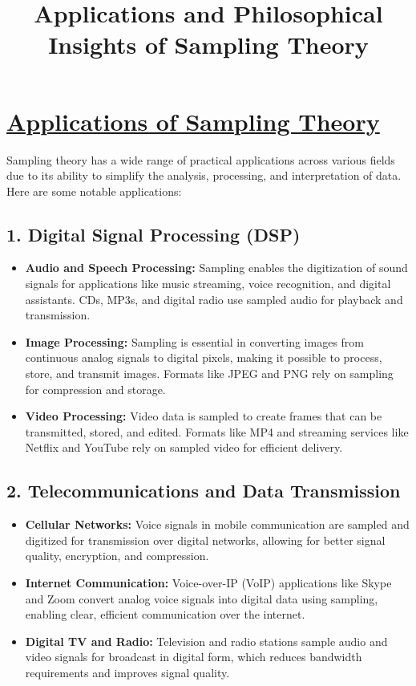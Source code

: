 \documentclass[12pt,a4paper]{report}
\begin{document}
\newpage

\title{\textbf{\Huge Applications and Philosophical Insights of Sampling Theory}}
\date{}



\maketitle

\section*{\underline{\textbf{Applications of Sampling Theory}}}

Sampling theory has a wide range of practical applications across various fields due to its ability to simplify the analysis, processing, and interpretation of data. Here are some notable applications:

\subsection*{1. Digital Signal Processing (DSP)}
\begin{itemize}
    \item \textbf{Audio and Speech Processing:} Sampling enables the digitization of sound signals for applications like music streaming, voice recognition, and digital assistants. CDs, MP3s, and digital radio use sampled audio for playback and transmission.
    \item \textbf{Image Processing:} Sampling is essential in converting images from continuous analog signals to digital pixels, making it possible to process, store, and transmit images. Formats like JPEG and PNG rely on sampling for compression and storage.
    \item \textbf{Video Processing:} Video data is sampled to create frames that can be transmitted, stored, and edited. Formats like MP4 and streaming services like Netflix and YouTube rely on sampled video for efficient delivery.
\end{itemize}

\subsection*{2. Telecommunications and Data Transmission}
\begin{itemize}
    \item \textbf{Cellular Networks:} Voice signals in mobile communication are sampled and digitized for transmission over digital networks, allowing for better signal quality, encryption, and compression.
    \item \textbf{Internet Communication:} Voice-over-IP (VoIP) applications like Skype and Zoom convert analog voice signals into digital data using sampling, enabling clear, efficient communication over the internet.
    \item \textbf{Digital TV and Radio:} Television and radio stations sample audio and video signals for broadcast in digital form, which reduces bandwidth requirements and improves signal quality.
\end{itemize}
\end{document}
